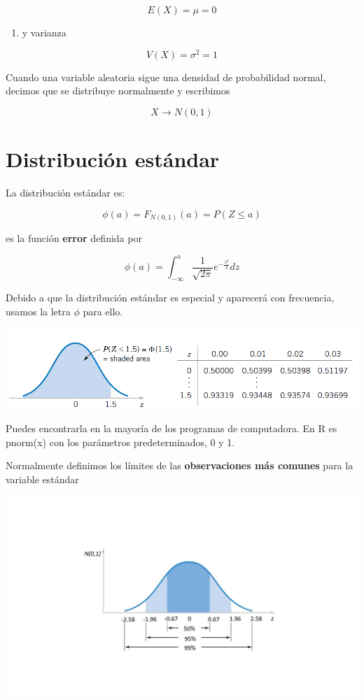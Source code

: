 \documentclass[
]{book}
\providecommand{\tightlist}{%
  \setlength{\itemsep}{0pt}\setlength{\parskip}{0pt}}
\begin{document}
\[E(X)= \mu = 0\]

\begin{enumerate}
\def\labelenumi{\arabic{enumi})}
\setcounter{enumi}{1}
\tightlist
\item
  y varianza
\end{enumerate}

\[V (X)= \sigma^2 =1\]

Cuando una variable aleatoria sigue una densidad de probabilidad normal, decimos que se distribuye normalmente y escribimos

\[X \rightarrow N(0,1)\]

\hypertarget{distribuciuxf3n-estuxe1ndar}{%
\section{Distribución estándar}\label{distribuciuxf3n-estuxe1ndar}}

La distribución estándar es:

\[\phi(a)=F_{N(0,1)}(a)=P(Z \leq a)\]

es la función \textbf{error} definida por

\[\phi(a)=\int_{-\infty}^{a} \frac{1}{\sqrt{2\pi}}e^{-\frac{z^2}{2}} dz\]

Debido a que la distribución estándar es especial y aparecerá con frecuencia, usamos la letra \(\phi\) para ello.

\includegraphics{./figures/st.png}

Puedes encontrarla en la mayoría de los programas de computadora. En R es pnorm(x) con los parámetros predeterminados, 0 y 1.

Normalmente definimos los límites de las \textbf{observaciones más comunes} para la variable estándar

\includegraphics{./figures/phi.JPG}
\end{document}

